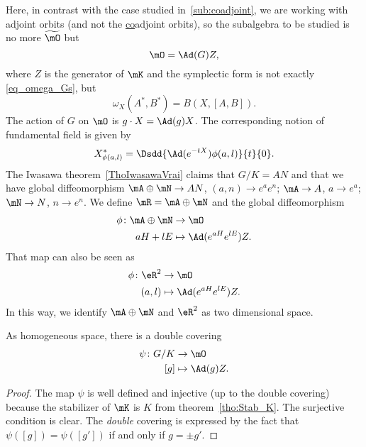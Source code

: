 Here, in contrast with the case studied in~\ref{sub:coadjoint}, we are working with adjoint orbits (and not the \underline{co}adjoint orbits), so the subalgebra to be studied is no more $\widetilde{\mO}$ but
\[
    \mO=\Ad(G)Z,
\]
where $Z$ is the generator of $\mK$ and the symplectic form is not exactly \eqref{eq_omega_Gs}, but
\begin{equation}\label{eq:omega_G}
  \omega_X(A^*,B^*)=B(X,[A,B]).
\end{equation}
The action of $G$ on $\mO$ is $g\cdot X=\Ad(g)X$. The corresponding notion of fundamental field is given by
\[
   X^*_{\phi(a,l)}=\Dsdd{ \Ad(e^{-tX})\phi(a,l) }{t}{0}.
\]
The Iwasawa theorem~\ref{ThoIwasawaVrai} claims that $G/K=AN$ and that we have global diffeomorphism $\mA\oplus\mN\to AN$, $(a,n)\to e^ae^n$; $\mA\to A$, $a\to e^a$; $\mN\to N$, $n\to e^n$. We define $\mR=\mA\oplus\mN$ and the global diffeomorphism
\begin{equation}    \label{EqDefphiaHlEZ}
\begin{aligned}
 \phi\colon \mA\oplus\mN&\to \mO \\
 aH+lE&\mapsto \Ad( e^{aH} e^{lE})Z.
\end{aligned}
\end{equation}
 That map can also be seen as
\begin{equation}
\begin{aligned}
 \phi\colon\eR^2&\to \mO \\
(a,l)&\mapsto\Ad(e^{aH}e^{lE})Z.
\end{aligned}
\end{equation}
 In this way, we identify $\mA\oplus\mN$ and $\eR^2$ as two dimensional space.
\begin{proposition}
As homogeneous space, there is a double covering
\begin{equation}
\begin{aligned}
 \psi\colon G/K&\to \mO \\
[g]&\mapsto \Ad(g)Z.
\end{aligned}
\end{equation}

\end{proposition}
\begin{proof}
The map $\psi$ is well defined and injective (up to the double covering) because the stabilizer of $\mK$ is $K$ from theorem~\ref{tho:Stab_K}. The surjective condition is clear. The \emph{double} covering is expressed by the fact that $\psi([g])=\psi([g'])$ if and only if $g=\pm g'$.
\end{proof}

